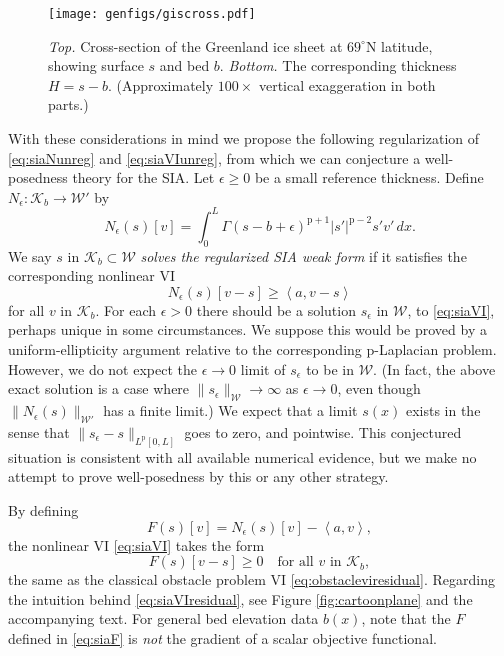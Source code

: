 \documentclass[letterpaper,final,12pt,reqno]{amsart}
\theoremstyle{claim}
\newcommand{\eps}{\epsilon}
\newcommand{\ip}[2]{\left<#1,#2\right>}
\newcommand{\pp}{{\text{p}}}
\numberwithin{equation}{section}
\numberwithin{figure}{section}
\numberwithin{table}{section}
\numberwithin{theorem}{section}
\begin{document}
\begin{figure}
\texttt{[image: genfigs/giscross.pdf]}
\caption{\emph{Top.}  Cross-section of the Greenland ice sheet at $69^\circ$N latitude, showing surface $s$ and bed $b$.  \emph{Bottom.} The corresponding thickness $H=s-b$.  (Approximately $100\times$ vertical exaggeration in both parts.)}
\label{fig:giscross}
\end{figure}

With these considerations in mind we propose the following regularization of \eqref{eq:siaNunreg} and \eqref{eq:siaVIunreg}, from which we can conjecture a well-posedness theory for the SIA.  Let $\eps \ge 0$ be a small reference thickness.  Define $N_\eps:\mathcal{K}_b \to \mathcal{W}'$ by
\begin{equation}
N_\eps(s)[v] = \int_0^L \Gamma (s-b+\eps)^{\pp+1} |s'|^{\pp-2} s' v'\,dx. \label{eq:siaN}
\end{equation}
We say $s$ in $\mathcal{K}_b \subset \mathcal{W}$ \emph{solves the regularized SIA weak form} if it satisfies the corresponding nonlinear VI
\begin{equation}
N_\eps(s)[v-s] \ge \ip{a}{v-s} \label{eq:siaVI}
\end{equation}
for all $v$ in $\mathcal{K}_b$.  For each $\eps>0$ there should be a solution $s_\eps$ in $\mathcal{W}$, to \eqref{eq:siaVI}, perhaps unique in some circumstances.  We suppose this would be proved by a uniform-ellipticity argument relative to the corresponding $\pp$-Laplacian problem.  However, we do not expect the $\eps\to 0$ limit of $s_\eps$ to be in $\mathcal{W}$.  (In fact, the above exact solution is a case where $\|s_\eps\|_{\mathcal{W}} \to \infty$ as $\eps\to 0$, even though $\|N_\eps(s)\|_{\mathcal{W}'}$ has a finite limit.)  We expect that a limit $s(x)$ exists in the sense that $\|s_\eps-s\|_{L^\pp[0,L]}$ goes to zero, and pointwise.  This conjectured situation is consistent with all available numerical evidence, but we make no attempt to prove well-posedness by this or any other strategy.

By defining
\begin{equation}
F(s)[v] = N_\eps(s)[v] - \ip{a}{v}, \label{eq:siaF}
\end{equation}
the nonlinear VI \eqref{eq:siaVI} takes the form
\begin{equation}
F(s)[v-s] \ge 0 \quad \text{for all } v \text{ in } \mathcal{K}_b, \label{eq:siaVIresidual}
\end{equation}
the same as the classical obstacle problem VI \eqref{eq:obstacleviresidual}.  Regarding the intuition behind \eqref{eq:siaVIresidual}, see Figure \ref{fig:cartoonplane} and the accompanying text.  For general bed elevation data $b(x)$, note that the $F$ defined in \eqref{eq:siaF} is \emph{not} the gradient of a scalar objective functional.
\end{document}
